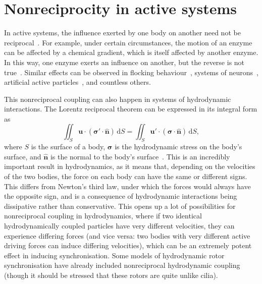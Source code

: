 \section{Nonreciprocity in active systems}
In active systems, the influence exerted by one body on another need not be reciprocal~. For example, under certain circumstances, the motion of an enzyme can be affected by a chemical gradient, which is itself affected by another enzyme. In this way, one enzyme exerts an influence on another, but the reverse is not true~. Similar effects can be observed in flocking behaviour~, systems of neurons~, artificial active particles~, and countless others.

This nonreciprocal coupling can also happen in systems of hydrodynamic interactions. The Lorentz reciprocal theorem can be expressed in its integral form as
\begin{equation}
    \iint_S \mathbf{u} \cdot (\mathbf{\sigma}' \cdot \hat{\mathbf{n}}) \, \mathrm{d}S = \iint_S \mathbf{u}' \cdot (\mathbf{\sigma} \cdot \hat{\mathbf{n}}) \, \mathrm{d}S,
\end{equation}
where $S$ is the surface of a body, $\mathbf\sigma$ is the hydrodynamic stress on the body's surface, and $\hat{\mathbf{n}}$ is the normal to the body's surface~. 
This is an incredibly important result in hydrodynamics, as it means that, depending on the velocities of the two bodies, the force on each body can have the same or different signs. This differs from Newton's third law, under which the forces would always have the opposite sign, and is a consequence of hydrodynamic interactions being dissipative rather than conservative. This opens up a lot of possibilities for nonreciprocal coupling in hydrodynamics, where if two identical hydrodynamically coupled particles have very different velocities, they can experience differing forces (and vice versa: two bodies with very different active driving forces can induce differing velocities), which can be an extremely potent effect in inducing synchronisation. Some models of hydrodynamic rotor synchronisation have already included nonreciprocal hydrodynamic coupling~ (though it should be stressed that these rotors are quite unlike cilia). %

